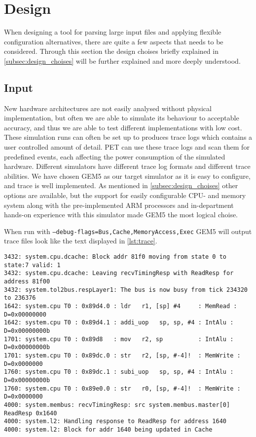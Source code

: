\section{Design}
When designing a tool for parsing large input files and applying flexible configuration alternatives,
there are quite a few aspects that needs to be considered. Through this section the design choises
briefly explained in \autoref{subsec:design_choises} will be further explained and more deeply understood.

\subsection{Input}
New hardware architectures are not easily analysed without physical
implementation, but often we are able to simulate its behaviour to acceptable
accuracy, and thus we are able to test different implementations with low cost.
These simulation runs can often be set up to produces trace logs which contains
a user controlled amount of detail. PET can use these trace logs and scan them
for predefined events, each affecting the power consumption of the simulated
hardware. Different simulators have different trace log formats and different
trace abilities. We have chosen GEM5 as our target simulator as it is easy to
configure, and trace is well implemented. As mentioned in
\autoref{subsec:design_choises} other options are available, but the support for
easily configurable CPU- and memory system along with the pre-implemented ARM
processors and in-department hands-on experience with this simulator made GEM5
the most logical choise.

When run with \texttt{--debug-flags=Bus,Cache,MemoryAccess,Exec} GEM5 will output trace files look like
the text displayed in \autoref{lst:trace}.

\begin{lstlisting}[basicstyle=\tiny,caption={gem5 trace log},label={lst:trace}]
3432: system.cpu.dcache: Block addr 81f0 moving from state 0 to state:7 valid: 1
3432: system.cpu.dcache: Leaving recvTimingResp with ReadResp for address 81f00
3432: system.tol2bus.respLayer1: The bus is now busy from tick 234320 to 236376
1642: system.cpu T0 : 0x89d4.0 : ldr   r1, [sp] #4     : MemRead :  D=0x00000000
1642: system.cpu T0 : 0x89d4.1 : addi_uop   sp, sp, #4 : IntAlu :  D=0x00000000b
1701: system.cpu T0 : 0x89d8   : mov   r2, sp          : IntAlu :  D=0x00000000b
1701: system.cpu T0 : 0x89dc.0 : str   r2, [sp, #-4]!  : MemWrite :  D=0x0000000
1760: system.cpu T0 : 0x89dc.1 : subi_uop   sp, sp, #4 : IntAlu :  D=0x00000000b
1760: system.cpu T0 : 0x89e0.0 : str   r0, [sp, #-4]!  : MemWrite :  D=0x0000000
4000: system.membus: recvTimingResp: src system.membus.master[0] ReadResp 0x1640
4000: system.l2: Handling response to ReadResp for address 1640
4000: system.l2: Block for addr 1640 being updated in Cache
\end{lstlisting}

